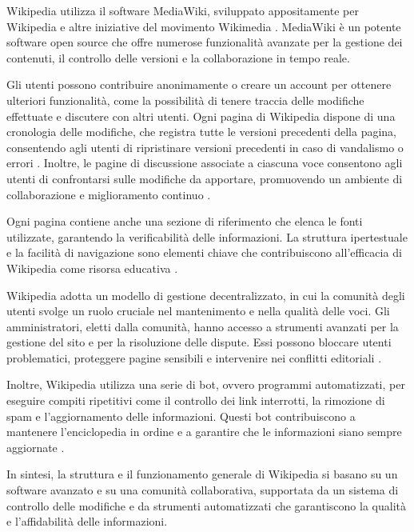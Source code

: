 \documentclass[12pt,a4paper]{report}
\begin{document}
Wikipedia utilizza il software MediaWiki, sviluppato appositamente per Wikipedia e altre iniziative del movimento Wikimedia \cite{denning2005wikipedia}. MediaWiki è un potente software open source che offre numerose funzionalità avanzate per la gestione dei contenuti, il controllo delle versioni e la collaborazione in tempo reale.

Gli utenti possono contribuire anonimamente o creare un account per ottenere ulteriori funzionalità, come la possibilità di tenere traccia delle modifiche effettuate e discutere con altri utenti. Ogni pagina di Wikipedia dispone di una cronologia delle modifiche, che registra tutte le versioni precedenti della pagina, consentendo agli utenti di ripristinare versioni precedenti in caso di vandalismo o errori \cite{wikiwikiweb}. Inoltre, le pagine di discussione associate a ciascuna voce consentono agli utenti di confrontarsi sulle modifiche da apportare, promuovendo un ambiente di collaborazione e miglioramento continuo \cite{jemielniak2014wikipedia}.

Ogni pagina contiene anche una sezione di riferimento che elenca le fonti utilizzate, garantendo la verificabilità delle informazioni. La struttura ipertestuale e la facilità di navigazione sono elementi chiave che contribuiscono all'efficacia di Wikipedia come risorsa educativa \cite{reagle2010good}.

Wikipedia adotta un modello di gestione decentralizzato, in cui la comunità degli utenti svolge un ruolo cruciale nel mantenimento e nella qualità delle voci. Gli amministratori, eletti dalla comunità, hanno accesso a strumenti avanzati per la gestione del sito e per la risoluzione delle dispute. Essi possono bloccare utenti problematici, proteggere pagine sensibili e intervenire nei conflitti editoriali \cite{denning2005wikipedia}.

Inoltre, Wikipedia utilizza una serie di bot, ovvero programmi automatizzati, per eseguire compiti ripetitivi come il controllo dei link interrotti, la rimozione di spam e l'aggiornamento delle informazioni. Questi bot contribuiscono a mantenere l'enciclopedia in ordine e a garantire che le informazioni siano sempre aggiornate \cite{history_of_wikis}.

In sintesi, la struttura e il funzionamento generale di Wikipedia si basano su un software avanzato e su una comunità collaborativa, supportata da un sistema di controllo delle modifiche e da strumenti automatizzati che garantiscono la qualità e l'affidabilità delle informazioni.
\end{document}
